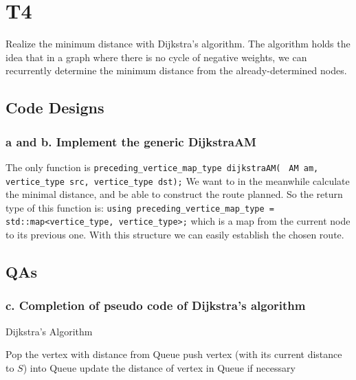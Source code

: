 \section{T4}

Realize the minimum distance with Dijkstra's algorithm. The algorithm holds the idea that in a graph where there is no cycle of negative weights, we can recurrently determine the minimum distance from the already-determined nodes.

\subsection{Code Designs}
\subsubsection*{a and b. Implement the generic \textbf{DijkstraAM}}

The only function is \texttt{preceding_vertice_map_type dijkstraAM(}\newline
\texttt{                  AM am, vertice_type src, vertice_type dst);}\newline
We want to in the meanwhile calculate the minimal distance, and be able to construct the route planned. So the return type of this function is: \newline
\texttt{using preceding_vertice_map_type = std::map<vertice_type, vertice_type>;}\newline
which is a map from the current node to its previous one. With this structure we can easily establish the chosen route.

\subsection{QAs}

\subsubsection*{c. Completion of pseudo code of Dijkstra's algorithm}

\begin{algorithm*}  
\caption{Dijkstra's Algorithm}  
\begin{algorithmic}  
\STATE Pop the vertex with  distance from Queue
 \STATE push vertex (with its current distance to $S$) into Queue \ENDIF
{} \STATE update the distance of vertex in Queue if necessary \ENDIF
\ENDFOR
\ENDWHILE
\end{algorithmic}  
\end{algorithm*}

